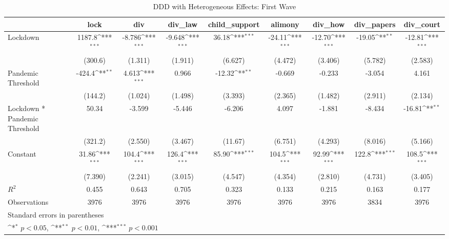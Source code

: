 \documentclass{article}
\begin{document}
{
\def\sym#1{\ifmmode^{#1}\else\(^{#1}\)\fi}
\begin{longtable}{l*{8}{c}}
\caption{DDD with Heterogeneous Effects: First Wave}\\
\hline\hline\endfirsthead\hline\endhead\hline\endfoot\endlastfoot
                &\multicolumn{1}{c}{lock}&\multicolumn{1}{c}{div}&\multicolumn{1}{c}{div\_law}&\multicolumn{1}{c}{child\_support}&\multicolumn{1}{c}{alimony}&\multicolumn{1}{c}{div\_how}&\multicolumn{1}{c}{div\_papers}&\multicolumn{1}{c}{div\_court}\\
\hline
Lockdown        &   1187.8\sym{***}&   -8.786\sym{***}&   -9.648\sym{***}&    36.18\sym{***}&   -24.11\sym{***}&   -12.70\sym{***}&   -19.05\sym{**} &   -12.81\sym{***}\\
                &  (300.6)         &  (1.311)         &  (1.911)         &  (6.627)         &  (4.472)         &  (3.406)         &  (5.782)         &  (2.583)         \\
Pandemic Threshold&   -424.4\sym{**} &    4.613\sym{***}&    0.966         &   -12.32\sym{**} &   -0.669         &   -0.233         &   -3.054         &    4.161         \\
                &  (144.2)         &  (1.024)         &  (1.498)         &  (3.393)         &  (2.365)         &  (1.482)         &  (2.911)         &  (2.134)         \\
Lockdown * Pandemic Threshold&    50.34         &   -3.599         &   -5.446         &   -6.206         &    4.097         &   -1.881         &   -8.434         &   -16.81\sym{**} \\
                &  (321.2)         &  (2.550)         &  (3.467)         &  (11.67)         &  (6.751)         &  (4.293)         &  (8.016)         &  (5.166)         \\
Constant        &    31.86\sym{***}&    104.4\sym{***}&    126.4\sym{***}&    85.90\sym{***}&    104.5\sym{***}&    92.99\sym{***}&    122.8\sym{***}&    108.5\sym{***}\\
                &  (7.390)         &  (2.241)         &  (3.015)         &  (4.547)         &  (4.354)         &  (2.810)         &  (4.731)         &  (3.405)         \\
\hline
\(R^{2}\)       &    0.455         &    0.643         &    0.705         &    0.323         &    0.133         &    0.215         &    0.163         &    0.177         \\
Observations    &     3976         &     3976         &     3976         &     3976         &     3976         &     3976         &     3834         &     3976         \\
\hline\hline
\multicolumn{9}{l}{\footnotesize Standard errors in parentheses}\\
\multicolumn{9}{l}{\footnotesize \sym{*} \(p<0.05\), \sym{**} \(p<0.01\), \sym{***} \(p<0.001\)}\\
\end{longtable}
}
\end{document}
